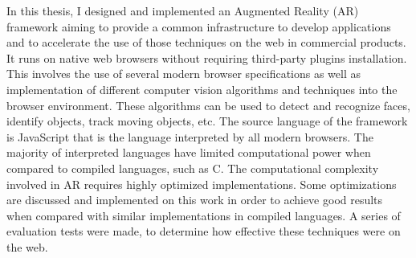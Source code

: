 In this thesis, I designed and implemented an Augmented Reality (AR) framework aiming to provide a common infrastructure to develop applications and to accelerate the use of those techniques on the web in commercial products.  It runs on native web browsers without requiring third-party plugins installation. This involves the use of several modern browser specifications as well as implementation of different computer vision algorithms and techniques into the browser environment. These algorithms can be used to detect and recognize faces, identify objects, track moving objects, etc.  The source language of the framework is JavaScript that is the language interpreted by all modern browsers. The majority of interpreted languages have limited computational power when compared to compiled languages, such as C. The computational complexity involved in AR requires highly optimized implementations. Some optimizations are discussed and implemented on this work in order to achieve good results when compared with similar implementations in compiled languages.  A series of evaluation tests were made, to determine how effective these techniques were on the web.


